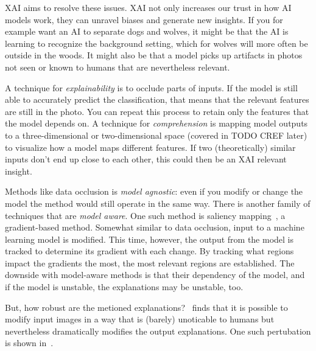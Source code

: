 \documentclass[10pt,twocolumn,letterpaper]{article}
\begin{document}
\gls{XAI} aims to resolve these issues. \gls{XAI} not only increases our trust in how \gls{AI} models work, they can unravel biases and generate new insights. If you for example want an \gls{AI} to separate dogs and wolves, it might be that the \gls{AI} is learning to recognize the background setting, which for wolves will more often be outside in the woods. It might also be that a model picks up artifacts in photos not seen or known to humans that are nevertheless relevant. 

A technique for \textit{explainability} is to occlude parts of inputs. If the model is still able to accurately predict the classification, that means that the relevant features are still in the photo. You can repeat this process to retain only the features that the model depends on. A technique for \textit{comprehension} is mapping model outputs to a three-dimensional or two-dimensional space (covered in TODO CREF later) to visualize how a model maps different features. If two (theoretically) similar inputs don't end up close to each other, this could then be an \gls{XAI} relevant insight.


Methods like data occlusion is \textit{model agnostic}: even if you modify or change the model the method would still operate in the same way. There is another family of techniques that are \textit{model aware}. One such method is saliency mapping~\cite{simonyan2014deep}, a gradient-based method. Somewhat similar to data occlusion, input to a machine learning model is modified. This time, however, the output from the model is tracked to determine its gradient with each change. By tracking what regions impact the gradients the most, the most relevant regions are established. The downside with model-aware methods is that their dependency of the model, and if the model is unstable, the explanations may be unstable, too.

But, how robust are the metioned explanations?~\cite{geometryToBlame} finds that it is possible to modify input images in a way that is (barely) unoticable to humans but nevertheless dramatically modifies the output explanations. One such pertubation is shown in~.

\end{document}
